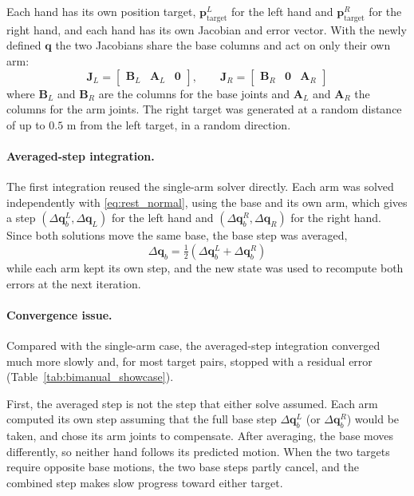 \documentclass[12pt,a4paper]{article}
\begin{document}
Each hand has its own position target, $\mathbf{p}^{L}_{\mathrm{target}}$ for the
left hand and $\mathbf{p}^{R}_{\mathrm{target}}$ for the right hand, and each hand
has its own Jacobian and error vector. With the newly defined $\mathbf{q}$ the two Jacobians share
the base columns and act on only their own arm:
\begin{equation}
    \mathbf{J}_L = \begin{bmatrix}\mathbf{B}_L & \mathbf{A}_L & \mathbf{0}\end{bmatrix},
    \qquad
    \mathbf{J}_R = \begin{bmatrix}\mathbf{B}_R & \mathbf{0} & \mathbf{A}_R\end{bmatrix}
    \label{eq:bimanual_jacobians}
\end{equation}
where $\mathbf{B}_L$ and $\mathbf{B}_R$ are the columns for the base joints and
$\mathbf{A}_L$ and $\mathbf{A}_R$ the columns for the arm joints. The right target
was generated at a random distance of up to $0.5$ m from the left target, in a
random direction.

\paragraph*{Averaged-step integration.}
The first integration reused the single-arm solver directly. Each arm was
solved independently with \eqref{eq:rest_normal}, using the base and its own
arm, which gives a step $(\Delta\mathbf{q}_b^{L},\Delta\mathbf{q}_L)$ for the left
hand and $(\Delta\mathbf{q}_b^{R},\Delta\mathbf{q}_R)$ for the right hand. Since both
solutions move the same base, the base step was averaged,
\begin{equation}
    \Delta\mathbf{q}_b = \tfrac{1}{2}\left(\Delta\mathbf{q}_b^{L}+\Delta\mathbf{q}_b^{R}\right)
\end{equation}
while each arm kept its own step, and the new state was used to recompute both
errors at the next iteration.


\paragraph*{Convergence issue.}
Compared with the single-arm case, the averaged-step integration converged
much more slowly and, for most target pairs, stopped with a residual error
(Table~\ref{tab:bimanual_showcase}).

First, the averaged step is not the step that either solve assumed. Each arm
computed its own step assuming that the full base step $\Delta\mathbf{q}_b^{L}$
(or $\Delta\mathbf{q}_b^{R}$) would be taken, and chose its arm joints to
compensate. After averaging, the base moves differently, so neither hand
follows its predicted motion. When the two targets require opposite base
motions, the two base steps partly cancel, and the combined step makes
slow progress toward either target.
\end{document}
